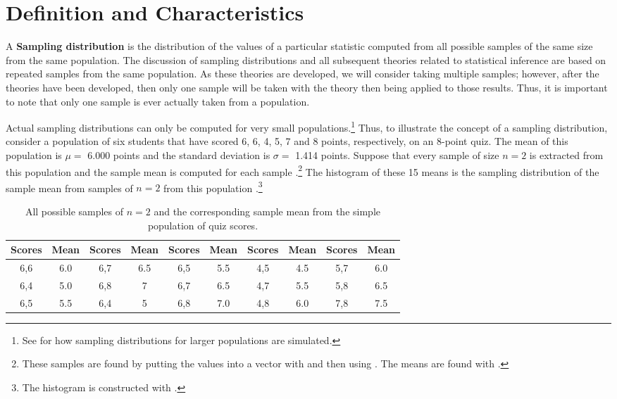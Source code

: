 \documentclass[10pt,openany]{book}\usepackage[]{graphicx}\usepackage[]{color}
\begin{document}


\section{Definition and Characteristics}  \label{sec:SDistDefn}
A \textbf{Sampling distribution} is the distribution of the values of a particular statistic computed from all possible samples of the same size from the same population. The discussion of sampling distributions and all subsequent theories related to statistical inference are based on repeated samples from the same population.  As these theories are developed, we will consider taking multiple samples; however, after the theories have been developed, then only one sample will be taken with the theory then being applied to those results. Thus, it is important to note that only one sample is ever actually taken from a population.




Actual sampling distributions can only be computed for very small populations.\footnote{See  for how sampling distributions for larger populations are simulated.}  Thus, to illustrate the concept of a sampling distribution, consider a population of six students that have scored 6, 6, 4, 5, 7 and 8 points, respectively, on an 8-point quiz.  The mean of this population is $\mu=$ 6.000 points and the standard deviation is $\sigma=$ 1.414 points.  Suppose that every sample of size $n=2$ is extracted from this population and the sample mean is computed for each sample .\footnote{These samples are found by putting the values into a vector with  and then using .  The means are found with .}  The histogram of these 15 means is the sampling distribution of the sample mean from samples of $n=2$ from this population .\footnote{The histogram is constructed with .}

\begin{table}[htbp]
  \caption{All possible samples of $n=2$ and the corresponding sample mean from the simple population of quiz scores.}
  \label{tab:SDistQuiz2}
  \centering
    \begin{tabular}{cc||cc||cc||cc||cc}
\hline\hline
Scores & Mean & Scores & Mean & Scores &  Mean & Scores & Mean & Scores & Mean \\
\hline
6,6 & 6.0 & 6,7 & 6.5 & 6,5 & 5.5 & 4,5 & 4.5 & 5,7 & 6.0 \\
6,4 & 5.0 & 6,8 & 7 & 6,7 & 6.5 & 4,7 & 5.5 & 5,8 & 6.5 \\
6,5 & 5.5 & 6,4 & 5 & 6,8 & 7.0 & 4,8 & 6.0 & 7,8 & 7.5 \\
\hline\hline
    \end{tabular}
\end{table}
\end{document}
